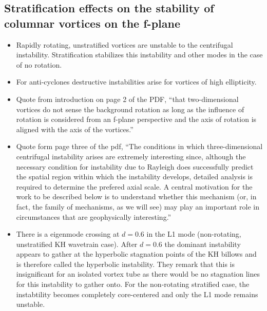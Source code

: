 \documentclass{article}
\begin{document}
    \subsection{Stratification eﬀects on the stability of columnar
    vortices on the f-plane}
    \begin{itemize}
        \item Rapidly rotating, unstratified vortices are unstable to the
        centrifugal instability. Stratification stabilizes this instability and
        other modes in the case of no rotation. 
        \item For anti-cyclones destructive instabilities arise for vortices of
        high ellipticity. 
        \item Quote from introduction on page 2 of the PDF, ``that two-dimensional vortices do
not sense the background rotation as long as the influence of rotation is considered
from an f-plane perspective and the axis of rotation is aligned with the axis of the
vortices.''
        \item Quote form page three of the pdf, ``The conditions in which three-dimensional centrifugal
instability arises are extremely interesting since, although the necessary condition for
instability due to Rayleigh does successfully predict the spatial region within which
the instability develops, detailed analysis is required to determine the prefered axial
scale. A central motivation for the work to be described below is to understand
whether this mechanism (or, in fact, the family of mechanisms, as we will see) may
play an important role in circumstances that are geophysically interesting.''
    \item There is a eigenmode crossing at $d = 0.6$ in the L1 mode
    (non-rotating, unstratified KH wavetrain case). After $d=0.6$ the dominant
    instability appears to gather at the hyperbolic stagnation points of the KH
    billows and is therefore called the hyperbolic instability. They remark that
    this is insignificant for an isolated vortex tube as there would be no
    stagnation lines for this instability to gather onto. For the non-rotating
    stratified case, the instabtility becomes completely core-centered and only
    the L1 mode remains unstable. 


\end{itemize}
\end{document}
